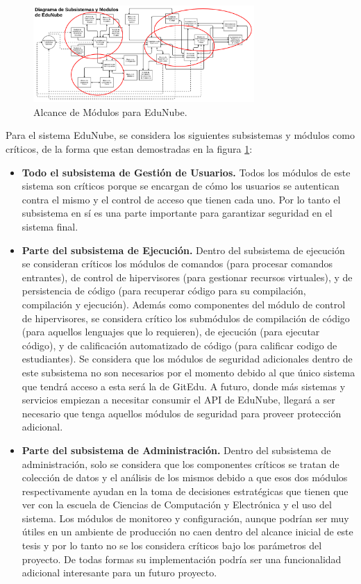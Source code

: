 \begin{figure}
  \begin{center}
    \includegraphics[width=0.75\textwidth]{Figures/alc_mod_en.png}
  \end{center}
  \caption{Alcance de Módulos para EduNube.}
  \label{alc_mod_en}
\end{figure}

Para el sistema EduNube, se considera los siguientes subsistemas y módulos como críticos, de la forma que estan demostradas en la figura \ref{alc_mod_en}:
\begin{itemize}
	\item \textbf{Todo el subsistema de Gestión de Usuarios.} Todos los módulos de este sistema son críticos porque se encargan de cómo los usuarios se autentican contra el mismo y el control de acceso que tienen cada uno. Por lo tanto el subsistema en sí es una parte importante para garantizar seguridad en el sistema final.
	\item \textbf{Parte del subsistema de Ejecución.} Dentro del subsistema de ejecución se consideran críticos los módulos de comandos (para procesar comandos entrantes), de control de hipervisores (para gestionar recursos virtuales), y de persistencia de código (para recuperar código para su compilación, compilación y ejecución).  Además como componentes del módulo de control de hipervisores, se considera crítico los submódulos de compilación de código (para aquellos lenguajes que lo requieren), de ejecución (para ejecutar código), y de calificación automatizado de código (para calificar codigo de estudiantes). Se considera que los módulos de seguridad adicionales dentro de este subsistema no son necesarios por el momento debido al que único sistema que tendrá acceso a esta será la de GitEdu. A futuro, donde más sistemas y servicios empiezan a necesitar consumir el API de EduNube, llegará a ser necesario que tenga aquellos módulos de seguridad para proveer protección adicional.
	\item \textbf{Parte del subsistema de Administración.} Dentro del subsistema de administración, solo se considera que los componentes críticos se tratan de colección de datos y el análisis de los mismos debido a que esos dos módulos respectivamente ayudan en la toma de decisiones estratégicas que tienen que ver con la escuela de Ciencias de Computación y Electrónica y el uso del sistema. Los módulos de monitoreo y configuración, aunque podrían ser muy útiles en un ambiente de producción no caen dentro del alcance inicial de este tesis y por lo tanto no se los considera críticos bajo los parámetros del proyecto. De todas formas su implementación podría ser una funcionalidad adicional interesante para un futuro proyecto.
\end{itemize}

